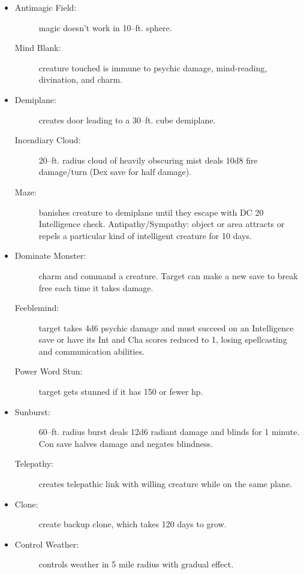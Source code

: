 \documentclass[DIV=14, paper=a4, fontsize=10pt, twocolumn, twoside]{scrartcl}
\begin{document}
\begin{itemize}[align=parleft,labelwidth=1cm]
	\renewcommand{\labelitemi}{Abjur}\item
	\begin{description}
 \item[Antimagic Field:] magic doesn’t work in 10–ft. sphere.
 \item[Mind Blank:] creature touched is immune to psychic damage, mind-reading, divination, and charm.
\end{description}
\renewcommand{\labelitemi}{Conj}\item
\begin{description}
 \item[Demiplane:] creates door leading to a 30–ft. cube demiplane.
 \item[Incendiary Cloud:] 20–ft. radius cloud of heavily obscuring mist deals 10d8 fire damage/turn (Dex save for half damage).
 \item[Maze:] banishes creature to demiplane until they escape with DC 20 Intelligence check. Antipathy/Sympathy: object or area attracts or repels a particular kind of intelligent creature for 10 days.
\end{description}
\renewcommand{\labelitemi}{Ench}\item
\begin{description}
 \item[Dominate Monster:] charm and command a creature. Target can make a new save to break free each time it takes damage.
 \item[Feeblemind:] target takes 4d6 psychic damage and must succeed on an Intelligence save or have its Int and Cha scores reduced to 1, losing spellcasting and communication abilities.
 \item[Power Word Stun:] target gets stunned if it has 150 or fewer hp.
\end{description}
\renewcommand{\labelitemi}{Evoc}\item
\begin{description}
 \item[Sunburst:] 60–ft. radius burst deals 12d6 radiant damage and blinds for 1 minute. Con save halves damage and negates blindness.
 \item[Telepathy:] creates telepathic link with willing creature while on the same plane.
\end{description}
\renewcommand{\labelitemi}{Necro}\item
\begin{description}
 \item[Clone:] create backup clone, which takes 120 days to grow.
\end{description}
\renewcommand{\labelitemi}{Trans}\item
\begin{description}
 \item[Control Weather:] controls weather in 5 mile radius with gradual effect.
\end{description}
\end{itemize}
\end{document}

